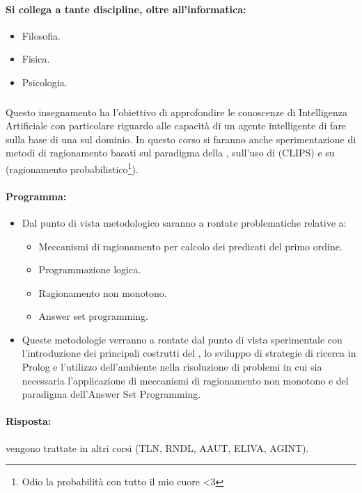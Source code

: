 \paragraph{Si collega a tante discipline, oltre all'informatica:}

\begin{itemize}
  \item Filosofia. 
  \item Fisica. 
  \item Psicologia.
\end{itemize}

\subsubsection{}

Questo insegnamento ha l’obiettivo di approfondire le
conoscenze di Intelligenza Artificiale con particolare riguardo
alle capacità di un agente intelligente di fare  sulla
base di una  sul dominio. In questo corso si faranno anche sperimentazione di metodi di ragionamento basati sul
paradigma della , sull’uso di
 (CLIPS) e su  (ragionamento probabilistico\footnote{Odio la probabilità con tutto il mio cuore <3}).

\paragraph{Programma:}

\begin{itemize}
  \item Dal punto di vista metodologico saranno a rontate problematiche relative a: 
    \begin{itemize}
      \item Meccanismi di ragionamento per calcolo dei predicati del primo
ordine. 
\item Programmazione logica.
\item Ragionamento non monotono. 
\item Answer set programming.
    \end{itemize}
  \item Queste metodologie verranno a rontate dal punto di vista sperimentale con
    l’introduzione dei principali costrutti del , lo sviluppo di strategie di
ricerca in Prolog e l’utilizzo dell’ambiente  nella risoluzione di
problemi in cui sia necessaria l’applicazione di meccanismi di ragionamento
non monotono e del paradigma dell’Answer Set Programming.
\end{itemize}



\paragraph{Risposta:} vengono trattate in altri corsi (TLN, RNDL, AAUT, ELIVA, AGINT).


